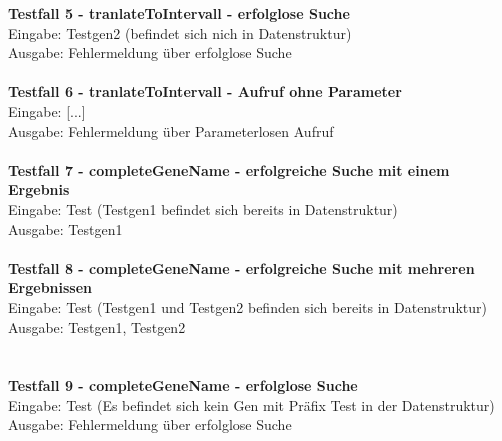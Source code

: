 \textbf{Testfall 5 - tranlateToIntervall - erfolglose Suche}\\
Eingabe: Testgen2 (befindet sich nich in Datenstruktur)\\
Ausgabe: Fehlermeldung über erfolglose Suche\\
\\
\textbf{Testfall 6 - tranlateToIntervall - Aufruf ohne Parameter}\\
Eingabe: [...]\\
Ausgabe: Fehlermeldung über Parameterlosen Aufruf\\
\\
\textbf{Testfall 7 - completeGeneName - erfolgreiche Suche mit einem Ergebnis}\\
Eingabe: Test (Testgen1 befindet sich bereits in Datenstruktur)\\
Ausgabe: Testgen1\\
\\
\textbf{Testfall 8 - completeGeneName - erfolgreiche Suche mit mehreren Ergebnissen}\\
Eingabe: Test (Testgen1 und Testgen2 befinden sich bereits in Datenstruktur)\\
Ausgabe: Testgen1, Testgen2\\
\\
\newpage\hfill\\
\textbf{Testfall 9 - completeGeneName - erfolglose Suche}\\
Eingabe: Test (Es befindet sich kein Gen mit Präfix Test in der Datenstruktur)\\
Ausgabe: Fehlermeldung über erfolglose Suche
